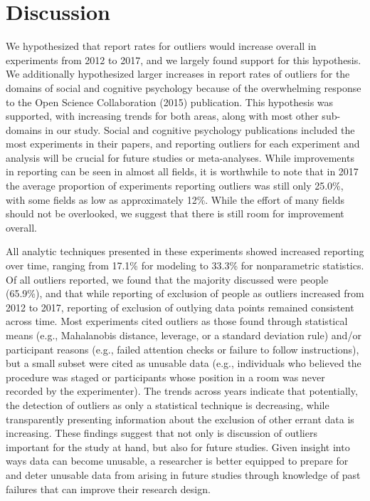\documentclass[english,,man]{apa6}
\theoremstyle{definition}
\theoremstyle{definition}
\theoremstyle{definition}
\theoremstyle{remark}
\begin{document}
\section{Discussion}\label{discussion}

We hypothesized that report rates for outliers would increase overall in
experiments from 2012 to 2017, and we largely found support for this
hypothesis. We additionally hypothesized larger increases in report
rates of outliers for the domains of social and cognitive psychology
because of the overwhelming response to the Open Science Collaboration
(2015) publication. This hypothesis was supported, with increasing
trends for both areas, along with most other sub-domains in our study.
Social and cognitive psychology publications included the most
experiments in their papers, and reporting outliers for each experiment
and analysis will be crucial for future studies or meta-analyses. While
improvements in reporting can be seen in almost all fields, it is
worthwhile to note that in 2017 the average proportion of experiments
reporting outliers was still only 25.0\%, with some fields as low as
approximately 12\%. While the effort of many fields should not be
overlooked, we suggest that there is still room for improvement overall.

All analytic techniques presented in these experiments showed increased
reporting over time, ranging from 17.1\% for modeling to 33.3\% for
nonparametric statistics. Of all outliers reported, we found that the
majority discussed were people (65.9\%), and that while reporting of
exclusion of people as outliers increased from 2012 to 2017, reporting
of exclusion of outlying data points remained consistent across time.
Most experiments cited outliers as those found through statistical means
(e.g., Mahalanobis distance, leverage, or a standard deviation rule)
and/or participant reasons (e.g., failed attention checks or failure to
follow instructions), but a small subset were cited as unusable data
(e.g., individuals who believed the procedure was staged or participants
whose position in a room was never recorded by the experimenter). The
trends across years indicate that potentially, the detection of outliers
as only a statistical technique is decreasing, while transparently
presenting information about the exclusion of other errant data is
increasing. These findings suggest that not only is discussion of
outliers important for the study at hand, but also for future studies.
Given insight into ways data can become unusable, a researcher is better
equipped to prepare for and deter unusable data from arising in future
studies through knowledge of past failures that can improve their
research design.
\end{document}
